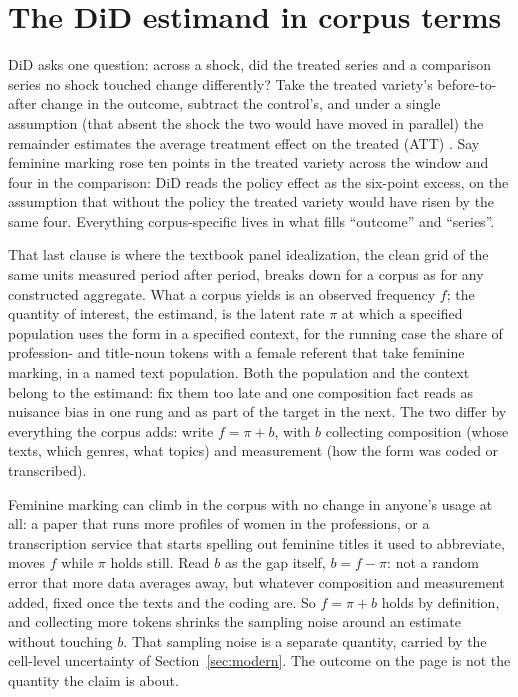\section{The DiD estimand in corpus terms}
\label{sec:estimand}

DiD asks one question: across a shock, did the treated series and a comparison series no shock touched change differently? Take the treated variety's before-to-after change in the outcome, subtract the control's, and under a single assumption (that absent the shock the two would have moved in parallel) the remainder estimates the average treatment effect on the treated (ATT) \citep{RothSantAnnaBilinskiPoe2023}. Say feminine marking rose ten points in the treated variety across the window and four in the comparison: DiD reads the policy effect as the six-point excess, on the assumption that without the policy the treated variety would have risen by the same four. Everything corpus-specific lives in what fills \enquote{outcome} and \enquote{series}.

That last clause is where the textbook panel idealization, the clean grid of the same units measured period after period, breaks down for a corpus as for any constructed aggregate. What a corpus yields is an observed frequency $f$; the quantity of interest, the estimand, is the latent rate $\pi$ at which a specified population uses the form in a specified context, for the running case the share of profession- and title-noun tokens with a female referent that take feminine marking, in a named text population. Both the population and the context belong to the estimand: fix them too late and one composition fact reads as nuisance bias in one rung and as part of the target in the next. The two differ by everything the corpus adds: write $f = \pi + b$, with $b$ collecting composition (whose texts, which genres, what topics) and measurement (how the form was coded or transcribed).

Feminine marking can climb in the corpus with no change in anyone's usage at all: a paper that runs more profiles of women in the professions, or a transcription service that starts spelling out feminine titles it used to abbreviate, moves $f$ while $\pi$ holds still. Read $b$ as the gap itself, $b = f - \pi$: not a random error that more data averages away, but whatever composition and measurement added, fixed once the texts and the coding are. So $f = \pi + b$ holds by definition, and collecting more tokens shrinks the sampling noise around an estimate without touching $b$. That sampling noise is a separate quantity, carried by the cell-level uncertainty of Section~\ref{sec:modern}. The outcome on the page is not the quantity the claim is about.


